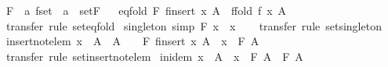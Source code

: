 \begin{isabellebody}
\isacommand{{\isachardot}{\isachardot}}\isamarkupfalse%
%
\endisatagproof
{\isafoldproof}%
%
\isadelimproof
%
\endisadelimproof
\isanewline
\isanewline
{}\isamarkupfalse%
\ F\ {\isacharcolon}{\isacharcolon}\ {\isachardoublequoteopen}{\isacharprime}a\ fset\ {\isasymRightarrow}\ {\isacharprime}a{\isachardoublequoteclose}\ \ set{\isachardot}F%
\isadelimproof
\ %
\endisadelimproof
%
\isatagproof
\isacommand{{\isachardot}}\isamarkupfalse%
%
\endisatagproof
{\isafoldproof}%
%
\isadelimproof
%
\endisadelimproof
\isanewline
\isanewline
{}\isamarkupfalse%
\ eq{\isacharunderscore}fold{\isacharcolon}\ {\isachardoublequoteopen}F\ {\isacharparenleft}finsert\ x\ A{\isacharparenright}\ {\isacharequal}\ ffold\ f\ x\ A{\isachardoublequoteclose}\isanewline
%
\isadelimproof
\ \ %
\endisadelimproof
%
\isatagproof
{}\isamarkupfalse%
\ transfer\ {\isacharparenleft}rule\ set{\isachardot}eq{\isacharunderscore}fold{\isacharparenright}%
\endisatagproof
{\isafoldproof}%
%
\isadelimproof
\isanewline
%
\endisadelimproof
\isanewline
{}\isamarkupfalse%
\ singleton\ {\isacharbrackleft}simp{\isacharbrackright}{\isacharcolon}\ {\isachardoublequoteopen}F\ {\isacharbraceleft}{\isacharbar}x{\isacharbar}{\isacharbraceright}\ {\isacharequal}\ x{\isachardoublequoteclose}\isanewline
%
\isadelimproof
\ \ %
\endisadelimproof
%
\isatagproof
{}\isamarkupfalse%
\ transfer\ {\isacharparenleft}rule\ set{\isachardot}singleton{\isacharparenright}%
\endisatagproof
{\isafoldproof}%
%
\isadelimproof
\isanewline
%
\endisadelimproof
\isanewline
{}\isamarkupfalse%
\ insert{\isacharunderscore}not{\isacharunderscore}elem{\isacharcolon}\ {\isachardoublequoteopen}x\ {\isacharbar}{\isasymnotin}{\isacharbar}\ A\ {\isasymLongrightarrow}\ A\ {\isasymnoteq}\ {\isacharbraceleft}{\isacharbar}{\isacharbar}{\isacharbraceright}\ {\isasymLongrightarrow}\ F\ {\isacharparenleft}finsert\ x\ A{\isacharparenright}\ {\isacharequal}\ x\ \isactrlbold {\isacharasterisk}\ F\ A{\isachardoublequoteclose}\isanewline
%
\isadelimproof
\ \ %
\endisadelimproof
%
\isatagproof
{}\isamarkupfalse%
\ transfer\ {\isacharparenleft}rule\ set{\isachardot}insert{\isacharunderscore}not{\isacharunderscore}elem{\isacharparenright}%
\endisatagproof
{\isafoldproof}%
%
\isadelimproof
\isanewline
%
\endisadelimproof
\isanewline
{}\isamarkupfalse%
\ in{\isacharunderscore}idem{\isacharcolon}\ {\isachardoublequoteopen}x\ {\isacharbar}{\isasymin}{\isacharbar}\ A\ {\isasymLongrightarrow}\ x\ \isactrlbold {\isacharasterisk}\ F\ A\ {\isacharequal}\ F\ A{\isachardoublequoteclose}\isanewline

\end{isabellebody}
